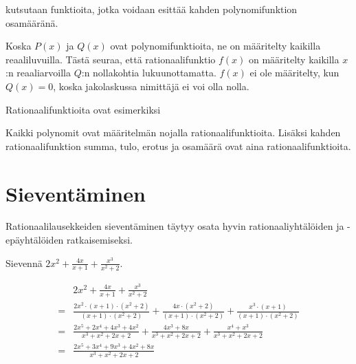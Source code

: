  kutsutaan funktioita, jotka voidaan esittää kahden
polynomifunktion osamääränä.


Koska $P(x)$ ja $Q(x)$ ovat polynomifunktioita, ne on määritelty kaikilla reaaliluvuilla. Tästä seuraa, että
rationaalifunktio $f(x)$ on määritelty kaikilla $x$:n reaaliarvoilla $Q$:n nollakohtia lukuunottamatta. $f(x)$ ei
ole määritelty, kun $Q(x)=0$, koska jakolaskussa nimittäjä ei voi olla nolla.

\begin{esimerkki}
	Rationaalifunktioita ovat esimerkiksi
\end{esimerkki}

Kaikki polynomit ovat määritelmän nojalla rationaalifunktioita. Lisäksi kahden rationaalifunktion summa, tulo, erotus ja osamäärä ovat aina rationaalifunktioita.

\section{Sieventäminen}

Rationaalilausekkeiden sieventäminen täytyy osata hyvin rationaaliyhtälöiden ja -epäyhtälöiden
ratkaisemiseksi.

\begin{esimerkki}
	Sievennä $2x^2 + \frac{4x}{x+1} + \frac{x^3}{x^2+2}$.
	\begin{esimratk}
		\begin{align*}
			  &2x^2 + \frac{4x}{x+1} + \frac{x^3}{x^2+2} \\
			= &\frac{2x^2 \cdot (x+1) \cdot (x^2+2)}{(x+1) \cdot (x^2+2)} + \frac{4x \cdot (x^2+2)}{(x+1) \cdot (x^2+2)} + \frac{x^3 \cdot (x+1)}{(x+1) \cdot (x^2+2)} \\
			= &\frac{2x^5 + 2x^4 + 4x^3 + 4x^2}{x^3+x^2+2x+2} + \frac{4x^3+8x}{x^3+x^2+2x+2} + \frac{x^4+x^3}{x^3+x^2+2x+2} \\
			= &\frac{2x^5+3x^4+9x^3+4x^2+8x}{x^3+x^2+2x+2}
		\end{align*}
	\end{esimratk}
\end{esimerkki}

